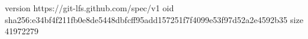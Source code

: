 version https://git-lfs.github.com/spec/v1
oid sha256:e34bf4f211fb0e8de5448dbfcff95add157251f7f4099e53f97d52a2e4592b35
size 41972279
